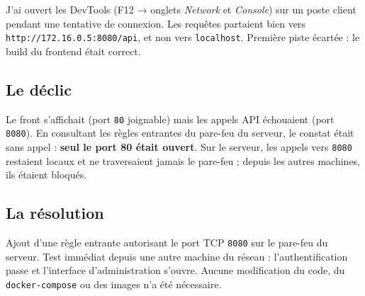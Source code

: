 \documentclass[10pt,twoside,openany]{article}
\begin{document}
J'ai ouvert les DevTools (F12 → onglets \textit{Network} et \textit{Console}) sur un poste client pendant une tentative de connexion. Les requêtes partaient bien vers \texttt{http://172.16.0.5:8080/api}, et non vers \texttt{localhost}. Première piste écartée : le build du frontend était correct.

\subsection*{Le déclic}
Le front s'affichait (port \texttt{80} joignable) mais les appels API échouaient (port \texttt{8080}). En consultant les règles entrantes du pare-feu du serveur, le constat était sans appel : \textbf{seul le port 80 était ouvert}. Sur le serveur, les appels vers \texttt{8080} restaient locaux et ne traversaient jamais le pare-feu ; depuis les autres machines, ils étaient bloqués.

\subsection*{La résolution}
Ajout d'une règle entrante autorisant le port TCP \texttt{8080} sur le pare-feu du serveur. Test immédiat depuis une autre machine du réseau : l'authentification passe et l'interface d'administration s'ouvre. Aucune modification du code, du \texttt{docker-compose} ou des images n'a été nécessaire.
\end{document}
